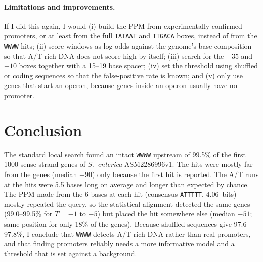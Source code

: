\documentclass[11pt,a4paper]{article}
\newcommand{\seqs}[1]{\texttt{#1}}
\begin{document}
\paragraph{Limitations and improvements.}
If I did this again, I would (i) build the PPM from experimentally confirmed promoters, or at least
from the full \seqs{TATAAT} and \seqs{TTGACA} boxes, instead of from the \seqs{WWWW} hits; (ii) score
windows as log-odds against the genome's base composition so that A/T-rich DNA does not score high by
itself; (iii) search for the $-35$ and $-10$ boxes together with a 15--19 base spacer; (iv) set the
threshold using shuffled or coding sequences so that the false-positive rate is known; and (v) only
use genes that start an operon, because genes inside an operon usually have no promoter.

\section{Conclusion}
The standard local search found an intact \seqs{WWWW} upstream of 99.5\% of the first 1000
sense-strand genes of \textit{S.~enterica} ASM2286996v1. The hits were mostly far from the genes
(median $-90$) only because the first hit is reported. The A/T runs at the hits were 5.5 bases long
on average and longer than expected by chance. The PPM made from the 6 bases at each hit (consensus
\seqs{ATTTTT}, 4.06~bits) mostly repeated the query, so the statistical alignment detected the same
genes (99.0--99.5\% for $T=-1$ to $-5$) but placed the hit somewhere else (median $-51$; same position
for only 18\% of the genes). Because shuffled sequences give 97.6--97.8\%, I conclude that
\seqs{WWWW} detects A/T-rich DNA rather than real promoters, and that finding promoters reliably needs
a more informative model and a threshold that is set against a background.
\end{document}
